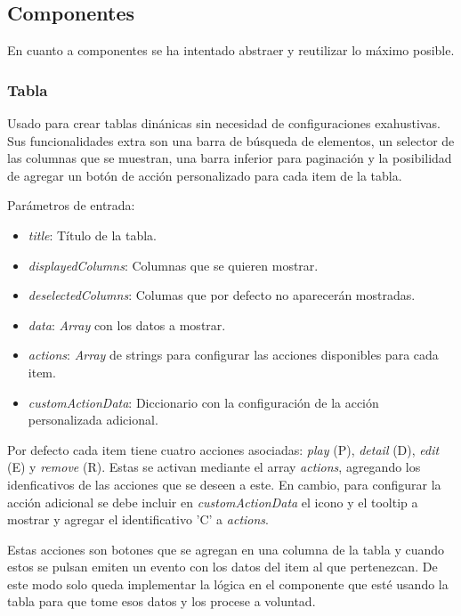 \subsection{Componentes}


En cuanto a componentes se ha intentado abstraer y reutilizar lo máximo posible.


\subsubsection{Tabla}


Usado para crear tablas dinánicas sin necesidad de configuraciones exahustivas. Sus funcionalidades extra son una barra de búsqueda de elementos, un selector de las columnas que se muestran, una barra inferior para paginación y la posibilidad de agregar un botón de acción personalizado para cada item de la tabla. 

\bigskip
Parámetros de entrada:
\begin{itemize}
	\item \textit{title}: Título de la tabla.
	\item \textit{displayedColumns}: Columnas que se quieren mostrar.
	\item \textit{deselectedColumns}: Columas que por defecto no aparecerán mostradas.
	\item \textit{data}: \textit{Array} con los datos a mostrar.
	\item \textit{actions}: \textit{Array} de strings para configurar las acciones disponibles para cada item.
	\item \textit{customActionData}: Diccionario con la configuración de la acción personalizada adicional.
\end{itemize}

Por defecto cada item tiene cuatro acciones asociadas: \textit{play} (P), \textit{detail} (D), \textit{edit} (E) y \textit{remove} (R). Estas se activan mediante el array \textit{actions}, agregando los idenficativos de las acciones que se deseen a este. En cambio, para configurar la acción adicional se debe incluir en \textit{customActionData} el icono y el tooltip a mostrar y agregar el identificativo 'C' a \textit{actions}.

Estas acciones son botones que se agregan en una columna de la tabla y cuando estos se pulsan emiten un evento con los datos del item al que pertenezcan. De este modo solo queda implementar la lógica en el componente que esté usando la tabla para que tome esos datos y los procese a voluntad.

